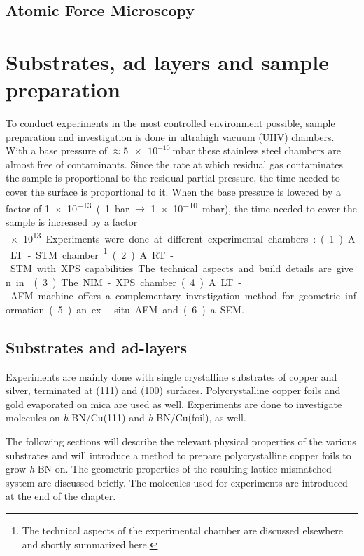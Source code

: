 \documentclass[
twoside,				%
BCOR=12mm,				%
headings=normal,		%
headsepline,			%
footsepline,			%
plainfootsepline,		%
]{scrbook}
\begin{document}
  \section{\textbf{A}tomic \textbf{F}orce \textbf{M}icroscopy}
  \label{section:afm}
	

\chapter{Substrates, ad layers and sample preparation}
To conduct experiments in the most controlled environment possible, sample preparation and investigation is done in ultrahigh vacuum (UHV) chambers. With a base pressure of $\approx \SI{5e-10}{\milli \bar}$ these stainless steel chambers are almost free of contaminants. Since the rate at which residual gas contaminates the sample is proportional to the residual partial pressure, the time needed to cover the surface is proportional to it. When the base pressure is lowered by a factor of \SI{1e-13} (\SI{1}{\bar} $\rightarrow$ \SI{1e-10}{\milli \bar}), the time needed to cover the sample is increased by a factor \SI{e13}. 

Experiments were done at different experimental chambers: (1) A LT-STM chamber. \footnote{The technical aspects of the experimental chamber are discussed elsewhere \cite{urgel_tendero_two-dimensional_2015, schwarz_assembly_2018, wiengarten_scanning_2015} and shortly summarized here.} (2) A RT-STM with XPS capabilities. The technical aspects and build details are given in \cite{schwarz_assembly_2018}. (3) The NIM-XPS chamber. 
(4) A LT-AFM machine offers a complementary investigation method for geometric information. (5) an ex-situ AFM and (6) a SEM.


  \section{Substrates and ad-layers}
Experiments are mainly done with single crystalline substrates of copper and silver, terminated at (111) and (100) surfaces. Polycrystalline copper foils and gold evaporated on mica are used as well. Experiments are done to investigate molecules on \textit{h}-BN/Cu(111) and \textit{h}-BN/Cu(foil), as well.

The following sections will describe the relevant physical properties of the various substrates and will introduce a method to prepare polycrystalline copper foils to grow \textit{h}-BN on. The geometric properties of the resulting lattice mismatched system are discussed briefly. The molecules used for experiments are introduced at the end of the chapter.
\end{document}
